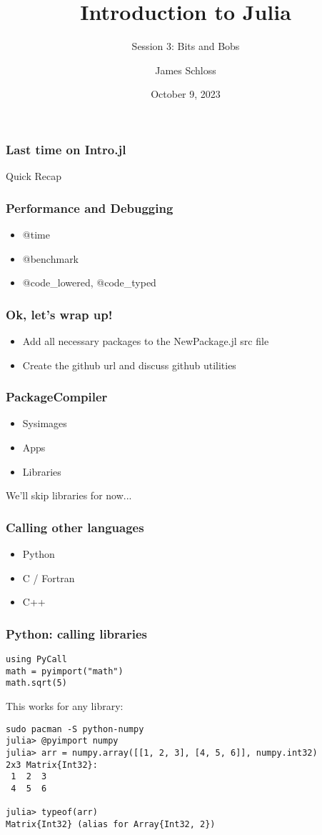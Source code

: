 \documentclass{beamer}
\title[Intro.jl]{Introduction to Julia} %
\subtitle{Session 3: Bits and Bobs}
\author{James Schloss} %
\institute[LeiosLabs] %
{
\textit{jrs.schloss@gmail.com} %
}
\date{October 9, 2023} %
\begin{document}
\begin{frame}
\vspace*{1.4cm}
\titlepage %
\end{frame}


\begin{frame}
\frametitle{Last time on Intro.jl}
\center \Huge{Quick Recap}
\end{frame}

\begin{frame}
\frametitle{Performance and Debugging}
\begin{itemize}
\item @time
\item @benchmark
\item @code\_lowered, @code\_typed
\end{itemize}
\end{frame}

\begin{frame}
\frametitle{Ok, let's wrap up!}
\begin{itemize}
\item Add all necessary packages to the NewPackage.jl src file
\item Create the github url and discuss github utilities
\end{itemize}
\end{frame}

\begin{frame}
\frametitle{PackageCompiler}
\begin{itemize}
\item Sysimages
\item Apps
\item Libraries
\end{itemize}
\pause
\center We'll skip libraries for now...
\end{frame}

\begin{frame}
\frametitle{Calling other languages}
\begin{itemize}
\item Python
\item C / Fortran
\item C++
\end{itemize}
\end{frame}

\begin{frame}[fragile]
\frametitle{Python: calling libraries}
\begin{lstlisting}
using PyCall
math = pyimport("math")
math.sqrt(5)
\end{lstlisting}

This works for any library:

\begin{lstlisting}
sudo pacman -S python-numpy
julia> @pyimport numpy
julia> arr = numpy.array([[1, 2, 3], [4, 5, 6]], numpy.int32)
2x3 Matrix{Int32}:
 1  2  3
 4  5  6

julia> typeof(arr)
Matrix{Int32} (alias for Array{Int32, 2})
\end{lstlisting}
\end{frame}
\end{document}
